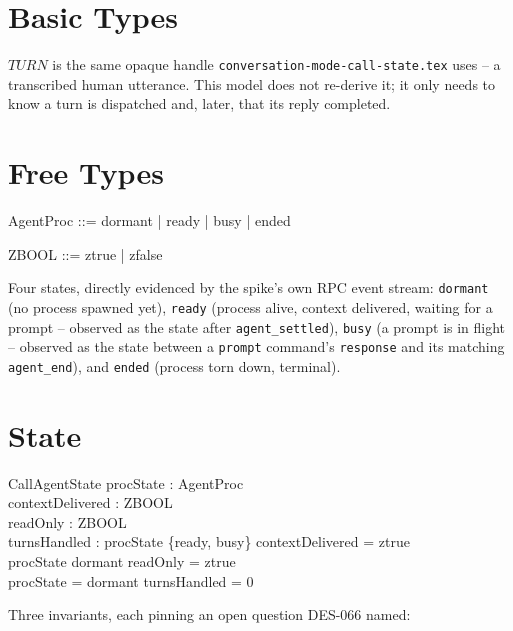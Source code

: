 \documentclass[a4paper,10pt,fleqn]{article}
\begin{document}
\section{Basic Types}

\begin{zed}
  [TURN]
\end{zed}

$TURN$ is the same opaque handle \texttt{conversation-mode-call-state.tex}
uses -- a transcribed human utterance. This model does not re-derive it; it
only needs to know a turn is dispatched and, later, that its reply completed.

\section{Free Types}

\begin{zed}
  AgentProc ::= dormant | ready | busy | ended
\end{zed}

\begin{zed}
  ZBOOL ::= ztrue | zfalse
\end{zed}

Four states, directly evidenced by the spike's own RPC event stream:
\texttt{dormant} (no process spawned yet), \texttt{ready} (process alive,
context delivered, waiting for a prompt -- observed as the state after
\texttt{agent\_settled}), \texttt{busy} (a prompt is in flight -- observed as
the state between a \texttt{prompt} command's \texttt{response} and its
matching \texttt{agent\_end}), and \texttt{ended} (process torn down, terminal).

\section{State}
\label{sec:state}

\begin{schema}{CallAgentState}
  procState : AgentProc \\
  contextDelivered : ZBOOL \\
  readOnly : ZBOOL \\
  turnsHandled : \nat
  \where
  procState \in \{ready, busy\} \implies contextDelivered = ztrue \\
  procState \neq dormant \implies readOnly = ztrue \\
  procState = dormant \implies turnsHandled = 0
\end{schema}

Three invariants, each pinning an open question DES-066 named:
\end{document}
